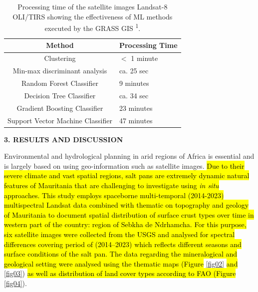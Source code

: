 \documentclass[12pt,a4paper,oneside]{article}
\def \newsection{\vspace{12pt}\textbf}
\def \newpar{\vspace{6pt}}
\begin{document}
\begin{table}[H]
\small
\caption{Processing time of the satellite images Landsat-8 OLI/TIRS showing the effectiveness of ML methods executed by the GRASS GIS \textsuperscript{1}.\label{tab2}}
\begin{tabularx}{\textwidth}{cp{4cm}}
			\toprule
			\textbf{Method} & \textbf{Processing Time} \\
			\midrule
			Clustering & $<$ 1 minute \\
			Min-max discriminant analysis & ca. 25 sec \\
			Random Forest Classifier & 9 minutes  \\
			Decision Tree Classifier & ca. 34 sec \\
			Gradient Boosting Classifier & 23 minutes  \\
			Support Vector Machine Classifier & 47 minutes  \\
			\bottomrule
\end{tabularx}
\end{table}

\newsection {3. RESULTS AND DISCUSSION}

\newpar Environmental and hydrological planning in arid regions of Africa is essential and is largely based on using geo-information such as satellite images. \hl{Due to their severe climate and vast spatial regions, salt pans are extremely dynamic natural features of Mauritania that are challenging to investigate using \emph{in situ} approaches. This study employs spaceborne multi-temporal (2014-2023) multispectral Landsat data combined with thematic on topography and geology of Mauritania to document spatial distribution of surface crust types over time in western part of the country: region of Sebkha de Ndrhamcha. For this purpose, six satellite images were collected from the USGS and analysed for spectral differences covering period of (2014--2023) which reflects different seasons and surface conditions of the salt pan. The data regarding the mineralogical and geological setting were analysed using the thematic maps (Figure} \ref{fig02} \hl{and }\ref{fig03}) \hl{as well as distribution of land cover types according to FAO (Figure} \ref{fig04}).
\end{document}

